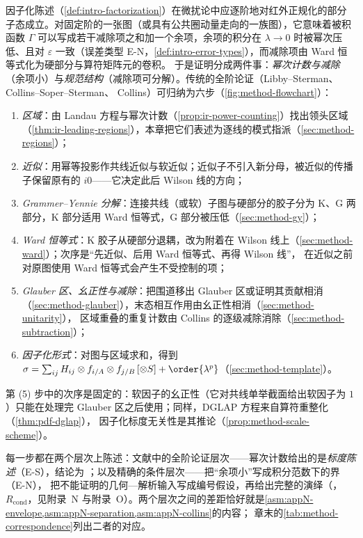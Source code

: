 因子化陈述（\cref{def:intro-factorization}）在微扰论中应逐阶地对红外正规化的部分子态成立。对固定阶的一张图（或具有公共圈动量走向的一族图），它意味着被积函数 $\Gamma$
可以写成若干减除项之和加一个余项，余项的积分在 $\lambda\to0$ 时被幂次压低、且对 $\varepsilon$ 一致（误差类型 E-N，\cref{def:intro-error-types}），而减除项由 Ward 恒等式化为硬部分与算符矩阵元的卷积。
于是证明分成两件事：\emph{幂次计数与减除}（余项小）与\emph{规范结构}（减除项可分解）。传统的全阶论证（Libby--Sterman\cite{LibbySterman1978a}、Collins--Soper--Sterman\cite{CollinsSoperSterman1989}、
Collins\cite{Collins2011}）可归纳为六步（\cref{fig:method-flowchart}）：
\begin{enumerate}[label=(\arabic*),leftmargin=2.2em,itemsep=0pt,topsep=2pt]
\item \emph{区域}：由 Landau 方程与幂次计数（\cref{prop:ir-power-counting}）找出领头区域（\cref{thm:ir-leading-regions}），本章把它们表述为逐线的模式指派（\cref{sec:method-regions}）；
\item \emph{近似}：用幂等投影作共线近似与软近似；近似子不引入新分母，被近似的传播子保留原有的 $i0$——它决定此后 Wilson 线的方向；
\item \emph{Grammer--Yennie 分解}：连接共线（或软）子图与硬部分的胶子分为 K、G 两部分，K 部分适用 Ward 恒等式，G 部分被压低（\cref{sec:method-gy}）；
\item \emph{Ward 恒等式}：K 胶子从硬部分退耦，改为附着在 Wilson 线上（\cref{sec:method-ward}）；次序是“先近似、后用 Ward 恒等式、再得 Wilson 线”，
  在近似之前对原图使用 Ward 恒等式会产生不受控制的项\cite{CollinsSoperSterman1989,Labastida:1984gy}；
\item \emph{Glauber 区、幺正性与减除}：把围道移出 Glauber 区或证明其贡献相消（\cref{sec:method-glauber}），末态相互作用由幺正性相消（\cref{sec:method-unitarity}），
  区域重叠的重复计数由 Collins 的逐级减除消除（\cref{sec:method-subtraction}）；
\item \emph{因子化形式}：对图与区域求和，得到 $\sigma=\sum_{ij}H_{ij}\otimes f_{i/A}\otimes f_{j/B}\,[\otimes S]+\order{\lambda^p}$（\cref{sec:method-template}）。
\end{enumerate}
第 (5) 步中的次序是固定的：软因子的幺正性（它对共线单举截面给出软因子为 $1$）只能在处理完 Glauber 区之后使用；同样，DGLAP 方程来自算符重整化（\cref{thm:pdf-dglap}），
因子化标度无关性是其推论（\cref{prop:method-scale-scheme}）。

每一步都在两个层次上陈述：文献中的全阶论证层次——幂次计数给出的是\emph{标度陈述}（E-S），结论为 \tagA；以及精确的条件层次——把“余项小”写成积分范数下的界（E-N），
把不能证明的几何—解析输入写成编号假设，再给出完整的演绎（\tagR，$R_{\mathrm{cond}}$，见附录~N 与附录~O）。两个层次之间的差距恰好就是\cref{asm:appN-envelope,asm:appN-separation,asm:appN-collins}的内容；
章末的\cref{tab:method-correspondence}列出二者的对应。

